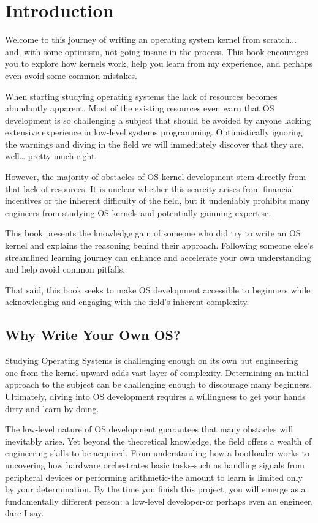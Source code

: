 \chapter{Introduction}

Welcome to this journey of writing an operating system kernel from scratch... and, with some optimism, not going insane in the 
process. This book encourages you to explore how kernels work, help you learn from my experience, and 
perhaps even avoid some common mistakes. 

When starting studying operating systems the lack of resources becomes abundantly apparent. Most of the existing resources even
warn that OS development is so challenging a subject that should be avoided by anyone lacking extensive experience
in low-level systems programming. Optimistically ignoring the warnings and diving in the field we will immediately discover 
that they are, well… pretty much right.

However, the majority of obstacles of OS kernel development stem directly from that lack of resources.
It is unclear whether this scarcity arises from financial incentives or the inherent difficulty of the field, 
but it undeniably prohibits many engineers from studying OS kernels and potentially gainning expertise.

This book presents the knowledge gain of someone who did try to write an OS kernel and explains the reasoning behind their 
approach. Following someone else's streamlined learning journey can enhance and accelerate your own understanding 
and help avoid common pitfalls.

That said, this book seeks to make OS development accessible to beginners while acknowledging and engaging with the 
field's inherent complexity.

\section{Why Write Your Own OS?}

Studying Operating Systems is challenging enough on its own but engineering one from the kernel upward adds vast layer of
complexity. Determining an initial approach to the subject can be challenging enough to discourage many beginners. 
Ultimately, diving into OS development requires a willingness to get your hands dirty and learn by doing.

The low-level nature of OS development guarantees that many obstacles will inevitably arise. 
Yet beyond the theoretical knowledge, the field offers a wealth of engineering skills to be acquired. 
From understanding how a bootloader works to uncovering how hardware orchestrates basic tasks-such as handling 
signals from peripheral devices or performing arithmetic-the amount to learn is limited only by your determination. 
By the time you finish this project, you will emerge as a fundamentally different person: a low-level developer-or 
perhaps even an engineer, dare I say.

